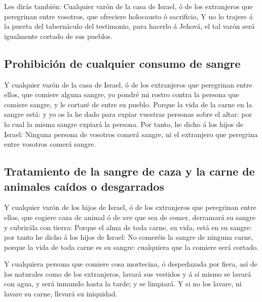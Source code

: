  Les dirás también: Cualquier varón de la casa de Israel, ó
de los extranjeros que peregrinan entre vosotros, que ofreciere
holocausto ó sacrificio,  Y no lo trajere á la puerta del
tabernáculo del testimonio, para hacerlo á Jehová, el tal varón será
igualmente cortado de sus pueblos.

\hypertarget{prohibiciuxf3n-de-cualquier-consumo-de-sangre}{%
\subsection{Prohibición de cualquier consumo de
sangre}\label{prohibiciuxf3n-de-cualquier-consumo-de-sangre}}

 Y cualquier varón de la casa de Israel, ó de los
extranjeros que peregrinan entre ellos, que comiere alguna sangre, yo
pondré mi rostro contra la persona que comiere sangre, y le cortaré de
entre su pueblo.  Porque la vida de la carne en la sangre
está: y yo os la he dado para expiar vuestras personas sobre el altar:
por lo cual la misma sangre expiará la persona.  Por tanto,
he dicho á los hijos de Israel: Ninguna persona de vosotros comerá
sangre, ni el extranjero que peregrina entre vosotros comerá sangre.

\hypertarget{tratamiento-de-la-sangre-de-caza-y-la-carne-de-animales-cauxeddos-o-desgarrados}{%
\subsection{Tratamiento de la sangre de caza y la carne de animales
caídos o
desgarrados}\label{tratamiento-de-la-sangre-de-caza-y-la-carne-de-animales-cauxeddos-o-desgarrados}}

 Y cualquier varón de los hijos de Israel, ó de los
extranjeros que peregrinan entre ellos, que cogiere caza de animal ó de
ave que sea de comer, derramará su sangre y cubrirála con tierra:
 Porque el alma de toda carne, su vida, está en su sangre:
por tanto he dicho á los hijos de Israel: No comeréis la sangre de
ninguna carne, porque la vida de toda carne es su sangre: cualquiera que
la comiere será cortado.

 Y cualquiera persona que comiere cosa mortecina, ó
despedazada por fiera, así de los naturales como de los extranjeros,
lavará sus vestidos y á sí mismo se lavará con agua, y será inmundo
hasta la tarde; y se limpiará.  Y si no los lavare, ni
lavare su carne, llevará su iniquidad.

